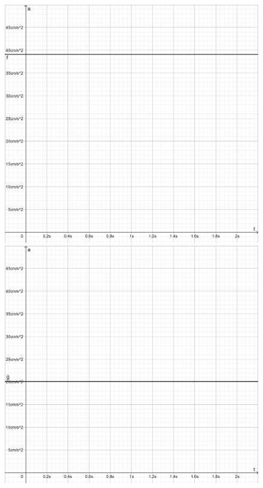 \documentclass[12pt]{article}
\begin{document}
\begin{enumerate}
    \begin{figure}[H]
        \centering
        \begin{minipage}{0.4\textwidth}
            \centering
            \includegraphics[scale=1.25]{LabReportImg/5TB-Acceleration.png}
        \end{minipage}
        \begin{minipage}{0.4\textwidth}
            \centering
            \includegraphics[scale=1.25]{LabReportImg/3TB-Acceleration.png}

\end{minipage}
\end{figure}
\end{enumerate}
\end{document}
